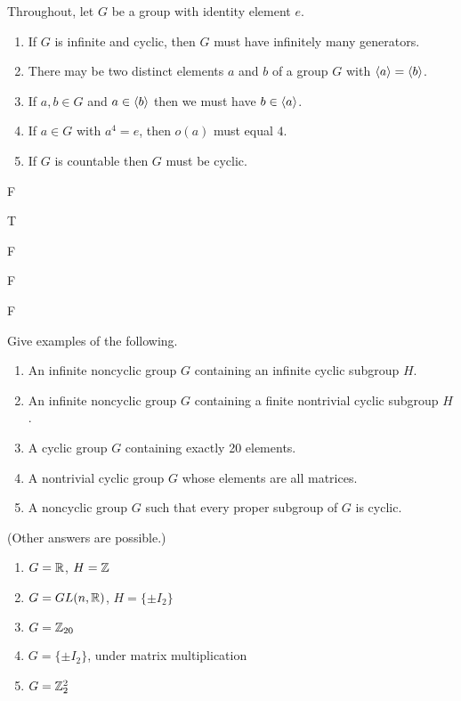 \begin{exercise}
\tf Throughout, let $G$ be a group with identity element $e$.

\begin{enumerate}
\item If $G$ is infinite and cyclic, then $G$ must have infinitely many generators.
\item There may be two distinct elements $a$ and $b$ of a group $G$ with $\langle a\rangle=\langle b\rangle$.
\item If $a,b\in G$ and $a\in \langle b\rangle$ then we must have $b\in \langle a\rangle$.
\item If $a\in G$ with $a^4=e$, then $o(a)$ must equal $4$.
\item If $G$ is countable then $G$ must be cyclic.
\end{enumerate}
\end{exercise}

\begin{solution}[print=false]

\begin{inparaenum}[(a)]
\item F \hfill \item T \hfill \item  F \hfill \item F \hfill \item F
\end{inparaenum}

\end{solution}


\begin{exercise}
Give examples of the following.

\begin{enumerate}
\item An infinite noncyclic group $G$ containing an infinite cyclic subgroup $H$.
\item An infinite noncyclic group $G$ containing a finite nontrivial cyclic subgroup $H$.
\item A cyclic group $G$ containing exactly 20 elements.
\item A nontrivial cyclic group $G$ whose elements are all matrices.
\item A noncyclic group $G$ such that every proper subgroup of $G$ is cyclic.
\end{enumerate}
\end{exercise}

\begin{solution}[print=false]
(Other answers are possible.)

\begin{enumerate}
\item $G=\mathbb{R}$, $H=\mathbb{Z}$ \quad
\item $G=GL(n,\mathbb{R})$, $H=\{\pm I_2\}$
\item $G=\mathbb{Z}_{20}$
\item $G=\{\pm I_2\}$, under matrix multiplication
\item $G=\mathbb{Z}_2^2$
\end{enumerate}
\end{solution}

